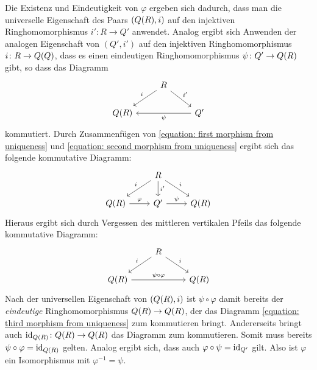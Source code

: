 \begin{remark}
  Die Existenz und Eindeutigkeit von $\varphi$ ergeben sich dadurch, dass man die universelle Eigenschaft des Paars $(Q(R), i)$ auf den injektiven Ringhomomorphismus $i' \colon R \to Q'$ anwendet.
  Analog ergibt sich Anwenden der analogen Eigenschaft von $(Q', i')$ auf den injektiven Ringhomomorphismus $i \colon R \to Q(Q)$, dass es einen eindeutigen Ringhomomorphismus $\psi \colon Q' \to Q(R)$ gibt, so dass das Diagramm
  \begin{equation}
    \label{equation: second morphism from uniqueness}
    \begin{tikzcd}
        {}
      & R
        \arrow[swap]{dl}{i}
        \arrow{dr}{i'}
      & {}
      \\
        \fraction{R}
      & {}
      & Q'
        \arrow{ll}{\psi}
    \end{tikzcd}
  \end{equation}
  kommutiert.
  Durch Zusammenfügen von \eqref{equation: first morphism from uniqueness} und \eqref{equation: second morphism from uniqueness} ergibt sich das folgende kommutative Diagramm:
  \begin{equation}
    \begin{tikzcd}
        {}
      & R
        \arrow[swap]{dl}{i}
        \arrow{d}{i'}
        \arrow{dr}{i}
      & {}
      \\
        \fraction{R}
        \arrow{r}{\varphi}
      & Q'
        \arrow{r}{\psi}
      & \fraction{R}
    \end{tikzcd}
  \end{equation}
  Hieraus ergibt sich durch Vergessen des mittleren vertikalen Pfeils das folgende kommutative Diagramm:
  \begin{equation}
    \label{equation: third morphism from uniqueness}
    \begin{tikzcd}
        {}
      & R
        \arrow[swap]{dl}{i}
        \arrow{dr}{i}
      & {}
      \\
        \fraction{R}
        \arrow{rr}{\psi \circ \varphi}
      & {}
      & \fraction{R}
    \end{tikzcd}
  \end{equation}
  Nach der universellen Eigenschaft von $(Q(R), i)$ ist $\psi \circ \varphi$ damit bereits der \emph{eindeutige} Ringhomomorphismus $Q(R) \to Q(R)$, der das Diagramm \eqref{equation: third morphism from uniqueness} zum kommutieren bringt.
  Andererseits bringt auch $\operatorname{id}_{Q(R)} \colon Q(R) \to Q(R)$ das Diagramm zum kommutieren.
  Somit muss bereits $\psi \circ \varphi = \operatorname{id}_{Q(R)}$ gelten.
  Analog ergibt sich, dass auch $\varphi \circ \psi = \operatorname{id}_{Q'}$ gilt.
  Also ist $\varphi$ ein Isomorphismus mit $\varphi^{-1} = \psi$.
\end{remark}
























